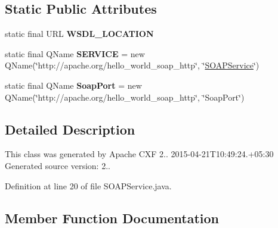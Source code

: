 \subsection*{Static Public Attributes}
\begin{DoxyCompactItemize}
\item 
\hypertarget{classorg_1_1apache_1_1hello__world__soap__http_1_1_s_o_a_p_service_a2d2133128396ffd49342edbe6f05dcb8}{}static final U\+R\+L {\bfseries W\+S\+D\+L\+\_\+\+L\+O\+C\+A\+T\+I\+O\+N}\label{classorg_1_1apache_1_1hello__world__soap__http_1_1_s_o_a_p_service_a2d2133128396ffd49342edbe6f05dcb8}

\item 
\hypertarget{classorg_1_1apache_1_1hello__world__soap__http_1_1_s_o_a_p_service_ab1eb03c5f5b305d94485777f68e797c9}{}static final Q\+Name {\bfseries S\+E\+R\+V\+I\+C\+E} = new Q\+Name(\char`\"{}http\+://apache.\+org/hello\+\_\+world\+\_\+soap\+\_\+http\char`\"{}, \char`\"{}\hyperlink{classorg_1_1apache_1_1hello__world__soap__http_1_1_s_o_a_p_service}{S\+O\+A\+P\+Service}\char`\"{})\label{classorg_1_1apache_1_1hello__world__soap__http_1_1_s_o_a_p_service_ab1eb03c5f5b305d94485777f68e797c9}

\item 
\hypertarget{classorg_1_1apache_1_1hello__world__soap__http_1_1_s_o_a_p_service_aad67e83249da31e7ad367e301400526a}{}static final Q\+Name {\bfseries Soap\+Port} = new Q\+Name(\char`\"{}http\+://apache.\+org/hello\+\_\+world\+\_\+soap\+\_\+http\char`\"{}, \char`\"{}Soap\+Port\char`\"{})\label{classorg_1_1apache_1_1hello__world__soap__http_1_1_s_o_a_p_service_aad67e83249da31e7ad367e301400526a}

\end{DoxyCompactItemize}


\subsection{Detailed Description}
This class was generated by Apache C\+X\+F 2.. 2015-\/04-\/21\+T10\+:49\+:24.+05\+:30 Generated source version\+: 2.. 

Definition at line 20 of file S\+O\+A\+P\+Service.\+java.



\subsection{Member Function Documentation}
\hypertarget{classorg_1_1apache_1_1hello__world__soap__http_1_1_s_o_a_p_service_a45b4e33fe293560a551cc0515bb3c22a}{}
